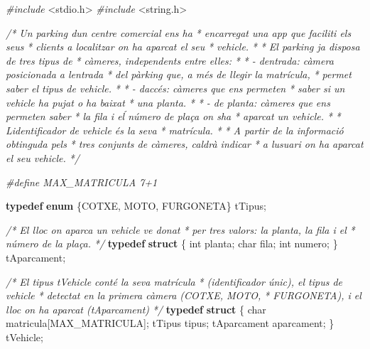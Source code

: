 \documentclass[]{book}
\newenvironment{Shaded}{\begin{snugshade}}{\end{snugshade}}
\newcommand{\CommentTok}[1]{\textcolor[rgb]{0.56,0.35,0.01}{\textit{#1}}}
\newcommand{\DataTypeTok}[1]{\textcolor[rgb]{0.13,0.29,0.53}{#1}}
\newcommand{\ImportTok}[1]{#1}
\newcommand{\KeywordTok}[1]{\textcolor[rgb]{0.13,0.29,0.53}{\textbf{#1}}}
\newcommand{\NormalTok}[1]{#1}
\newcommand{\PreprocessorTok}[1]{\textcolor[rgb]{0.56,0.35,0.01}{\textit{#1}}}
\begin{document}
\begin{Shaded}
\begin{Highlighting}[]
\PreprocessorTok{\#include }\ImportTok{\textless{}stdio.h\textgreater{}}
\PreprocessorTok{\#include }\ImportTok{\textless{}string.h\textgreater{}}

\CommentTok{/* Un parking d\textquotesingle{}un centre comercial ens ha }
\CommentTok{ * encarregat una app que faciliti els seus}
\CommentTok{ * clients a localitzar on ha aparcat el seu}
\CommentTok{ * vehicle.}
\CommentTok{ * }
\CommentTok{ * El parking ja disposa de tres tipus de }
\CommentTok{ * càmeres, independents entre elles:}
\CommentTok{ * }
\CommentTok{ * {-} d\textquotesingle{}entrada: càmera posicionada a l\textquotesingle{}entrada}
\CommentTok{ *   del pàrking que, a més de llegir la matrícula,}
\CommentTok{ *   permet saber el tipus de vehicle.}
\CommentTok{ * }
\CommentTok{ * {-} d\textquotesingle{}accés: càmeres que ens permeten}
\CommentTok{ *   saber si un vehicle ha pujat o ha baixat}
\CommentTok{ *   una planta.}
\CommentTok{ * }
\CommentTok{ * {-} de planta: càmeres que ens permeten saber}
\CommentTok{ *   la fila i eĺ número de plaça on s\textquotesingle{}ha }
\CommentTok{ *   aparcat un vehicle.}
\CommentTok{ * }
\CommentTok{ * L\textquotesingle{}identificador de vehicle és la seva }
\CommentTok{ * matrícula.}
\CommentTok{ * }
\CommentTok{ * A partir de la informació obtinguda pels}
\CommentTok{ * tres conjunts de càmeres, caldrà indicar}
\CommentTok{ * a l\textquotesingle{}usuari on ha aparcat el seu vehicle.}
\CommentTok{ */}

\PreprocessorTok{\#define MAX\_MATRICULA 7+1}

\KeywordTok{typedef} \KeywordTok{enum}\NormalTok{ \{COTXE, MOTO, FURGONETA\} tTipus;}

\CommentTok{/* El lloc on aparca un vehicle ve donat}
\CommentTok{ * per tres valors: la planta, la fila i el }
\CommentTok{ * número de la plaça.}
\CommentTok{ */}
\KeywordTok{typedef} \KeywordTok{struct}\NormalTok{ \{}
    \DataTypeTok{int}\NormalTok{ planta;}
    \DataTypeTok{char}\NormalTok{ fila;}
    \DataTypeTok{int}\NormalTok{ numero;}
\NormalTok{\} tAparcament;}

\CommentTok{/* El tipus tVehicle conté la seva matrícula}
\CommentTok{ * (identificador únic), el tipus de vehicle}
\CommentTok{ * detectat en la primera càmera (COTXE, MOTO,}
\CommentTok{ * FURGONETA), i el lloc on ha aparcat (tAparcament)}
\CommentTok{ */}
\KeywordTok{typedef} \KeywordTok{struct}\NormalTok{ \{}
    \DataTypeTok{char}\NormalTok{ matricula[MAX\_MATRICULA];}
\NormalTok{    tTipus tipus;}
\NormalTok{    tAparcament aparcament;}
\NormalTok{\} tVehicle;}


\end{Highlighting}
\end{Shaded}
\end{document}

